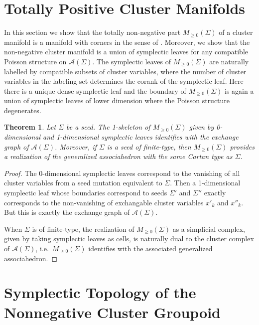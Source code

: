 \documentclass{amsart}
\newtheorem{theorem}{Theorem}[section]
\numberwithin{equation}{section}
\newcommand{\cA}{\mathcal{A}}
\begin{document}
\section{Totally Positive Cluster Manifolds}
In this section we show that the totally non-negative part $M_{\ge0}(\Sigma)$ of a cluster manifold is a manifold with corners in the sense of \cite{MR3077259}.  
Moreover, we show that the non-negative cluster manifold is a union of symplectic leaves for any compatible Poisson structure on $\cA(\Sigma)$.  
The symplectic leaves of $M_{\ge0}(\Sigma)$ are naturally labelled by compatible subsets of cluster variables, where the number of cluster variables in the labeling set determines the corank of the symplectic leaf.
Here there is a unique dense symplectic leaf and the boundary of $M_{\ge0}(\Sigma)$ is again a union of symplectic leaves of lower dimension where the Poisson structure degenerates.

\begin{theorem}
  Let $\Sigma$ be a seed.  
  The 1-skeleton of $M_{\ge0}(\Sigma)$ given by 0-dimensional and 1-dimensional symplectic leaves identifies with the exchange graph of $\cA(\Sigma)$.  
  Moreover, if $\Sigma$ is a seed of finite-type, then $M_{\ge0}(\Sigma)$ provides a realization of the generalized associahedron with the same Cartan type as $\Sigma$.
\end{theorem}
\begin{proof}
  The 0-dimensional symplectic leaves correspond to the vanishing of all cluster variables from a seed mutation equivalent to $\Sigma$.  
  Then a 1-dimensional symplectic leaf whose boundaries correspond to seeds $\Sigma'$ and $\Sigma''$ exactly corresponds to the non-vanishing of exchangable cluster variables $x'_k$ and $x''_k$.
  But this is exactly the exchange graph of $\cA(\Sigma)$.

  When $\Sigma$ is of finite-type, the realization of $M_{\ge0}(\Sigma)$ as a simplicial complex, given by taking symplectic leaves as cells, is naturally dual to the cluster complex of $\cA(\Sigma)$, i.e.\ $M_{\ge0}(\Sigma)$ identifies with the associated generalized associahedron.
\end{proof}

\section{Symplectic Topology of the Nonnegative Cluster Groupoid}






\end{document}
